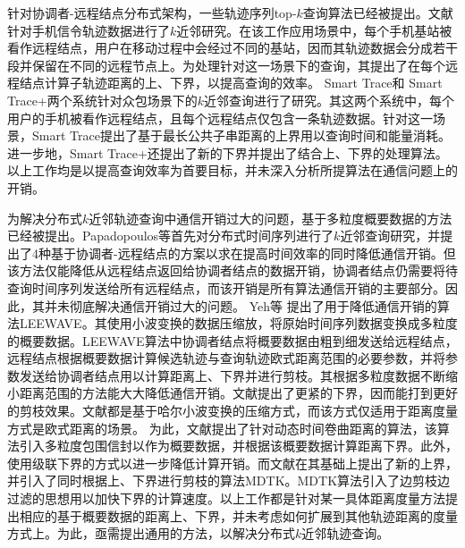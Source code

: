 针对协调者-远程结点分布式架构，一些轨迹序列top-$k$查询算法已经被提出\cite{CIKMSimilarity,SmartTrace,crowdsourced}。文献\cite{CIKMSimilarity}针对手机信令轨迹数据进行了$k$近邻研究。在该工作应用场景中，每个手机基站被看作远程结点，用户在移动过程中会经过不同的基站，因而其轨迹数据会分成若干段并保留在不同的远程节点上。为处理针对这一场景下的查询，其提出了在每个远程结点计算子轨迹距离的上、下界，以提高查询的效率。
Smart Trace\cite{SmartTrace}和 Smart Trace+\cite{crowdsourced}两个系统针对众包场景下的$k$近邻查询进行了研究。其这两个系统中，每个用户的手机被看作远程结点，且每个远程结点仅包含一条轨迹数据。针对这一场景，Smart Trace提出了基于最长公共子串距离的上界用以查询时间和能量消耗。进一步地，Smart Trace+还提出了新的下界并提出了结合上、下界的处理算法。以上工作均是以提高查询效率为首要目标，并未深入分析所提算法在通信问题上的开销。


为解决分布式$k$近邻轨迹查询中通信开销过大的问题，基于多粒度概要数据的方法已经被提出\cite{PapadopoulosM01,LeeWave,DTKST,bandwidth,bandwidth}。Papadopoulos等\cite{PapadopoulosM01}首先对分布式时间序列进行了$k$近邻查询研究，并提出了4种基于协调者-远程结点的方案以求在提高时间效率的同时降低通信开销。但该方法仅能降低从远程结点返回给协调者结点的数据开销，协调者结点仍需要将待查询时间序列发送给所有远程结点，而该开销是所有算法通信开销的主要部分。因此，其并未彻底解决通信开销过大的问题。
Yeh等 \cite{LeeWave}提出了用于降低通信开销的算法LEEWAVE。其使用小波变换的数据压缩放，将原始时间序列数据变换成多粒度的概要数据。LEEWAVE算法中协调者结点将概要数据由粗到细发送给远程结点，远程结点根据概要数据计算候选轨迹与查询轨迹欧式距离范围的必要参数，并将参数发送给协调者结点用以计算距离上、下界并进行剪枝。其根据多粒度数据不断缩小距离范围的方法能大大降低通信开销。文献\cite{KashyapK11,DTKST}提出了更紧的下界，因而能打到更好的剪枝效果。文献\cite{LeeWave,KashyapK11,DTKST}都是基于哈尔小波变换的压缩方式，而该方式仅适用于距离度量方式是欧式距离的场景。
为此，文献\cite{bandwidth}提出了针对动态时间卷曲距离的算法，该算法引入多粒度包围信封以作为概要数据，并根据该概要数据计算距离下界。此外，使用级联下界的方式以进一步降低计算开销。而文献\cite{bandwidth}在其基础上提出了新的上界，并引入了同时根据上、下界进行剪枝的算法MDTK。MDTK算法引入了边剪枝边过滤的思想用以加快下界的计算速度。以上工作都是针对某一具体距离度量方法提出相应的基于概要数据的距离上、下界，并未考虑如何扩展到其他轨迹距离的度量方式上。为此，亟需提出通用的方法，以解决分布式$k$近邻轨迹查询。


\clearpage
\phantom{s}
\clearpage